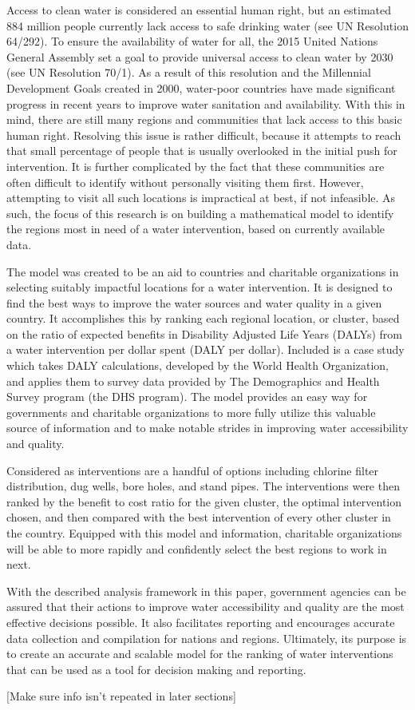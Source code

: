 Access to clean water is considered an essential human right, but an estimated 884 million people currently lack access to safe drinking water (see UN Resolution 64/292).
To ensure the availability of water for all, the 2015 United Nations General Assembly set a goal to provide universal access to clean water by 2030 (see UN Resolution 70/1).
As a result of this resolution and the Millennial Development Goals created in 2000, water-poor countries have made significant progress in recent years to improve water sanitation and availability.
With this in mind, there are still many regions and communities that lack access to this basic human right.
Resolving this issue is rather difficult, because it attempts to reach that small percentage of people that is usually overlooked in the initial push for intervention.
It is further complicated by the fact that these communities are often difficult to identify without personally visiting them first.
However, attempting to visit all such locations is impractical at best, if not infeasible.
As such, the focus of this research is on building a mathematical model to identify the regions most in need of a water intervention, based on currently available data. 

The model was created to be an aid to countries and charitable organizations in selecting suitably impactful locations for a water intervention.
It is designed to find the best ways to improve the water sources and water quality in a given country.
It accomplishes this by ranking each regional location, or cluster, based on the ratio of expected benefits in Disability Adjusted Life Years (DALYs) from a water intervention per dollar spent (DALY per dollar).
Included is a case study which takes DALY calculations, developed by the World Health Organization, and applies them to survey data provided by The Demographics and Health Survey program (the DHS program).
The model provides an easy way for governments and charitable organizations to more fully utilize this valuable source of information and to make notable strides in improving water accessibility and quality.

Considered as interventions are a handful of options including chlorine filter distribution, dug wells, bore holes, and stand pipes.
The interventions were then ranked by the benefit to cost ratio for the given cluster, the optimal intervention chosen, and then compared with the best intervention of every other cluster in the country.
Equipped with this model and information, charitable organizations will be able to more rapidly and confidently select the best regions to work in next.

With the described analysis framework in this paper, government agencies can be assured that their actions to improve water accessibility and quality are the most effective decisions possible.
It also facilitates reporting and encourages accurate data collection and compilation for nations and regions.
Ultimately, its purpose is to create an accurate and scalable model for the ranking of water interventions that can be used as a tool for decision making and reporting.

[Make sure info isn't repeated in later sections]
